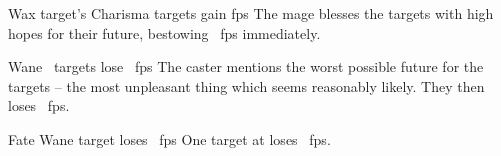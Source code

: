   {\mFate}%
  {Wax}%
  {\duplicated}%
  {target's Charisma}%
  {\spellArea{} targets gain  \glspl{fp}}%
  {
    The mage blesses the targets with high hopes for their future, bestowing \rollConv~\glspl{fp} immediately.
  }

  {\mFate}%
  {Wane}%
  {\duplicated}%
  {}%
  {\spellArea\ targets lose \rollConv~\glspl{fp}}%
  {
    The caster mentions the worst possible future for the targets -- the most unpleasant thing which seems reasonably likely.
    They then loses \rollConv~\glspl{fp}.
  }

  {Fate}%
  {Wane}%
  {\distant}%
  {}%
  {target loses \rollConv~\glspl{fp}}%
  {
    One target at \spellRange{} loses \rollConv~\glspl{fp}.
  }

